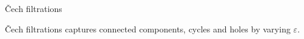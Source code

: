 \documentclass[aspectratio=169, 10pt, dvipsnames]{beamer}
\begin{document}
\begin{frame}[fragile]{\v{C}ech filtrations}
  \begin{minipage}{0.7\textwidth}
    \begin{figure}
      \centering
      \label{fig:cech}
    \end{figure}
  \end{minipage}
  \hfill
  \begin{minipage}{0.25\textwidth}
    \small \v{C}ech filtrations captures connected components, cycles and holes
    by varying $\varepsilon$.
  \end{minipage}
\end{frame}
\end{document}
